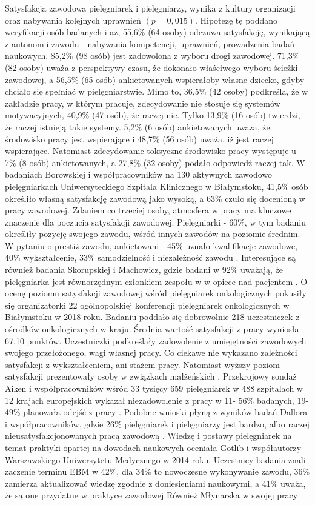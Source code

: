 \documentclass[a4paper,12pt,twoside,openright]{mwrep}
\begin{document}
Satysfakcja zawodowa pielęgniarek i pielęgniarzy, wynika z kultury organizacji oraz nabywania kolejnych uprawnień $(p = 0,015)$. Hipotezę tę poddano weryfikacji osób badanych i aż, 55,6\%  (64 osoby) odczuwa satysfakcję, wynikającą z autonomii zawodu - nabywania kompetencji, uprawnień, prowadzenia badań naukowych.   85,2\% (98 osób) jest zadowolona z wyboru drogi zawodowej. 71,3\% (82 osoby) uważa z perspektywy czasu, że dokonało właściwego wyboru ścieżki zawodowej, a 56,5\% (65 osób) ankietowanych wspierałoby własne dziecko, gdyby chciało się spełniać w pielęgniarstwie. Mimo to, 36,5\% (42 osoby) podkreśla, że w zakładzie pracy, w którym pracuje,   zdecydowanie nie stosuje się systemów motywacyjnych, 40,9\% (47 osób), że raczej nie. Tylko 13,9\% (16 osób) twierdzi, że raczej istnieją takie systemy. 5,2\% (6 osób) ankietowanych uważa, że środowisko pracy jest wspierające i 48,7\%  (56 osób)  uważa, iż jest raczej wspierające. Natomiast zdecydowanie toksyczne środowisko pracy występuje u 7\% (8 osób) ankietowanych, a 27,8\%  (32 osoby) podało odpowiedź raczej tak. W badaniach  Borowskiej i współpracowników na 130 aktywnych zawodowo pielęgniarkach Uniwersyteckiego Szpitala Klinicznego w Białymstoku, 41,5\% osób określiło własną satysfakcję zawodową jako wysoką, a 63\% czuło się docenioną w pracy zawodowej. Zdaniem co trzeciej osoby, atmosfera w pracy ma kluczowe znaczenie dla poczucia satysfakcji zawodowej. Pielęgniarki - 60\%, w tym badaniu określiły  pozycję swojego zawodu, wśród innych zawodów na poziomie średnim. W pytaniu o prestiż zawodu, ankietowani - 45\% uznało kwalifikacje zawodowe, 40\% wykształcenie, 33\% samodzielność i niezależność zawodu \cite{zbiorowa}. Interesujące są również badania Skorupskiej  i Machowicz, gdzie badani w 92\% uważają, że pielęgniarka jest równorzędnym członkiem zespołu w w opiece nad pacjentem \cite{skorupska}. O ocenę poziomu satysfakcji zawodowej wśród pielęgniarek onkologicznych pokusiły się organizatorki 22 ogólnopolskiej konferencji pielęgniarek onkologicznych w Białymstoku w 2018 roku. Badaniu poddało się dobrowolnie 218 uczestniczek z ośrodków onkologicznych w kraju. Średnia wartość satysfakcji z pracy wyniosła 67,10 punktów. Uczestniczki podkreślały zadowolenie z umiejętności zawodowych swojego przełożonego, wagi własnej pracy. Co ciekawe nie wykazano zależności satysfakcji z wykształceniem, ani stażem pracy. Natomiast wyższy poziom satysfakcji prezentowały osoby w związkach małżeńskich \cite{onkologiczne}. Przekrojowy sondaż Aiken i współpracowników wśród  33 tysięcy 659 pielęgniarek w 488 szpitalach w 12 krajach europejskich wykazał niezadowolenie z pracy  w 11- 56\% badanych, 19-49\% planowała odejść z pracy \cite{termedia}. Podobne wnioski płyną z wyników badań Dallora  i współpracowników, gdzie 26\% pielęgniarek i pielęgniarzy jest bardzo, albo raczej nieusatysfakcjonowanych pracą zawodową \cite{dalora}. Wiedzę i postawy pielęgniarek na temat praktyki opartej na dowodach naukowych oceniała Gotlib i współautorzy Warszawskiego Uniwersytetu Medycznego w 2014 roku. Uczestnicy badania znali zaczenie terminu EBM w 42\%, dla 34\% to nowoczesne wykonywanie zawodu, 36\% zamierza aktualizować wiedzę zgodnie z doniesieniami naukowymi, a 41\% uważa, że są one przydatne w praktyce zawodowej \cite{gotlib} Również Młynarska w swojej pracy 
\end{document}
